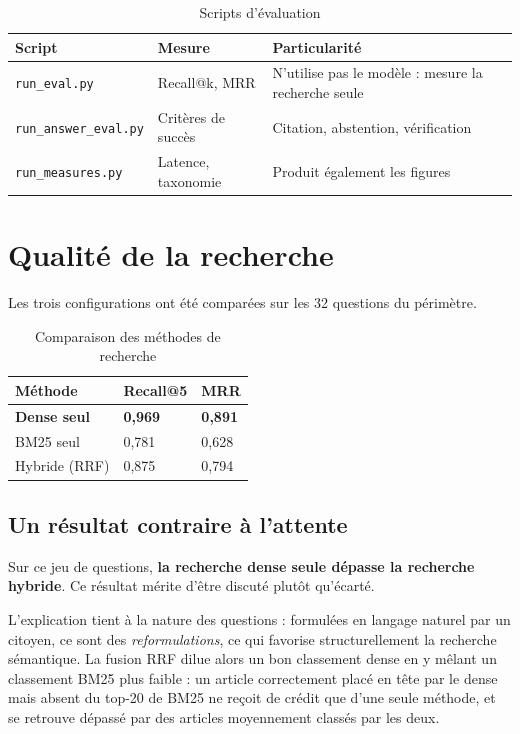 \begin{table}[H]
    \centering
    \begin{tabular}{|m{3.6cm}|m{4.2cm}|m{6.2cm}|}
        \hline
        \textbf{Script} & \textbf{Mesure} & \textbf{Particularité} \\
        \hline
        \texttt{run\_eval.py} & Recall@k, MRR & N'utilise pas le modèle : mesure la recherche seule \\
        \hline
        \texttt{run\_answer\_eval.py} & Critères de succès & Citation, abstention, vérification \\
        \hline
        \texttt{run\_measures.py} & Latence, taxonomie & Produit également les figures \\
        \hline
    \end{tabular}
    \caption{Scripts d'évaluation}
    \label{tab:scripts-eval}
\end{table}

\section{Qualité de la recherche}

Les trois configurations ont été comparées sur les 32 questions du périmètre.

\begin{table}[H]
    \centering
    \begin{tabular}{|m{4cm}|m{3cm}|m{3cm}|}
        \hline
        \textbf{Méthode} & \textbf{Recall@5} & \textbf{MRR} \\
        \hline
        \textbf{Dense seul} & \textbf{0{,}969} & \textbf{0{,}891} \\
        \hline
        BM25 seul & 0{,}781 & 0{,}628 \\
        \hline
        Hybride (RRF) & 0{,}875 & 0{,}794 \\
        \hline
    \end{tabular}
    \caption{Comparaison des méthodes de recherche}
    \label{tab:recherche}
\end{table}

\subsection{Un résultat contraire à l'attente}

Sur ce jeu de questions, \textbf{la recherche dense seule dépasse la recherche hybride}. Ce
résultat mérite d'être discuté plutôt qu'écarté.

L'explication tient à la nature des questions : formulées en langage naturel par un citoyen, ce
sont des \emph{reformulations}, ce qui favorise structurellement la recherche sémantique. La
fusion RRF dilue alors un bon classement dense en y mêlant un classement BM25 plus faible : un
article correctement placé en tête par le dense mais absent du top-20 de BM25 ne reçoit de
crédit que d'une seule méthode, et se retrouve dépassé par des articles moyennement classés par
les deux.

